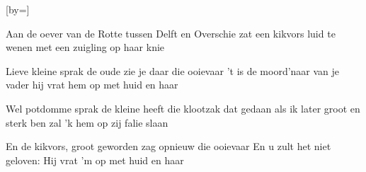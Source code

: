 

[by=]


\beginverse
Aan de oever van de Rotte
tussen Delft en Overschie
zat een kikvors luid te wenen
met een zuigling op haar knie
\endverse

\beginverse
Lieve kleine sprak de oude
zie je daar die ooievaar
't is de moord'naar van je vader
hij vrat hem op met huid en haar
\endverse

\beginverse

Wel potdomme sprak de kleine
heeft die klootzak dat gedaan
als ik later groot en sterk ben
zal 'k hem op zij falie slaan
\endverse

\beginverse

En de kikvors, groot geworden
zag opnieuw die ooievaar
En u zult het niet geloven:
Hij vrat 'm op met huid en haar
\endverse




\endsong
